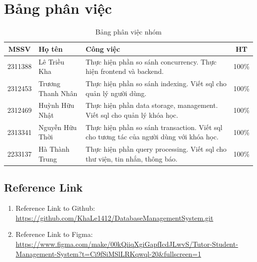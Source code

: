 \documentclass[12pt, a4paper, oneside]{report}
\begin{document}
\chapter*{Bảng phân việc}
\begin{table}[H]
    \centering
    \begin{tabularx}{\textwidth}{|c|l|X|c|}
        \hline
        \textbf{MSSV} & \textbf{Họ tên} & \centering\arraybackslash\textbf{Công việc} & \textbf{HT} \\
        \hline
        2311388 & Lê Triều Kha & Thực hiện phần so sánh concurrency. Thực hiện frontend và backend. & 100\% \\
        \hline
        2312453 & Trương Thanh Nhân & Thực hiện phần so sánh indexing. Viết sql cho quản lý người dùng. & 100\% \\
        \hline
        2312469 & Huỳnh Hữu Nhật & Thực hiện phần data storage, management. Viết sql cho quản lý khóa học. & 100\% \\
        \hline
        2313341 & Nguyễn Hữu Thời & Thực hiện phần so sánh transaction. Viết sql cho tương tác của người dùng với khóa học. & 100\% \\
        \hline
        2233137 & Hà Thành Trung & Thực hiện phần query processing. Viết sql cho thư viện, tin nhắn, thông báo. & 100\% \\
        \hline
    \end{tabularx}
    \caption{Bảng phân việc nhóm}
    \label{tab:bang-phan-viec}
\end{table}

\patchcmd{\chapter}{\thispagestyle{plain}}{\thispagestyle{fancy}}{}{}
\tableofcontents
\newpage








\newpage
\section*{Reference Link}
\begin{enumerate}
    \item Reference Link to Github: \url{https://github.com/KhaLe1412/DatabaseManagementSystem.git}
    \item Reference Link to Figma: \url{https://www.figma.com/make/00kQiiqXgiGapfIcdJLwvS/Tutor-Student-Management-System?t=Ci9fSiMSlLRKqwql-20&fullscreen=1}
\end{enumerate}
\end{document}
